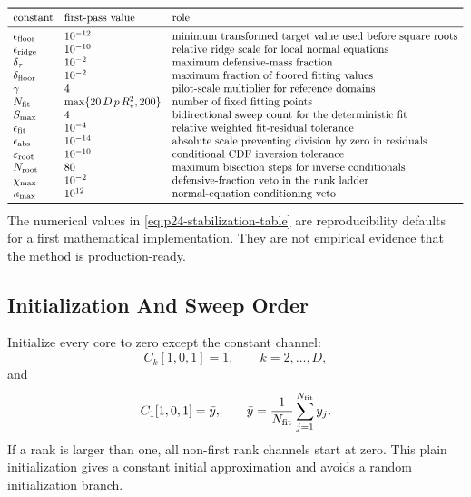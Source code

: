 \documentclass[11pt]{article}
\numberwithin{equation}{section}
\begin{document}
\begin{equation}
\begin{array}{lll}
\toprule
\text{constant} & \text{first-pass value} & \text{role}\\
\midrule
\epsilon_{\rm floor} & 10^{-12} &
    \text{minimum transformed target value used before square roots}\\
\epsilon_{\rm ridge} & 10^{-10} &
    \text{relative ridge scale for local normal equations}\\
\delta_\tau & 10^{-2} &
    \text{maximum defensive-mass fraction}\\
\delta_{\rm floor} & 10^{-2} &
    \text{maximum fraction of floored fitting values}\\
\gamma & 4 &
    \text{pilot-scale multiplier for reference domains}\\
N_{\rm fit} & \max\{20\,D\,p\,R_\star^2,200\} &
    \text{number of fixed fitting points}\\
S_{\max} & 4 &
    \text{bidirectional sweep count for the deterministic fit}\\
\epsilon_{\rm fit} & 10^{-4} &
    \text{relative weighted fit-residual tolerance}\\
\epsilon_{\rm abs} & 10^{-14} &
    \text{absolute scale preventing division by zero in residuals}\\
\varepsilon_{\rm root} & 10^{-10} &
    \text{conditional CDF inversion tolerance}\\
N_{\rm root} & 80 &
    \text{maximum bisection steps for inverse conditionals}\\
\chi_{\max} & 10^{-2} &
    \text{defensive-fraction veto in the rank ladder}\\
\kappa_{\max} & 10^{12} &
    \text{normal-equation conditioning veto}\\
\bottomrule
\end{array}
\label{eq:p24-stabilization-table}
\end{equation}
The numerical values in \eqref{eq:p24-stabilization-table} are reproducibility
defaults for a first mathematical implementation.  They are not empirical
evidence that the method is production-ready.

\subsection{Initialization And Sweep Order}

Initialize every core to zero except the constant channel:
\[
    C_k[1,0,1]=1,\qquad k=2,\ldots,D,
\]
and
\[
    C_1[1,0,1]=\bar y,\qquad
    \bar y=\frac1{N_{\rm fit}}\sum_{j=1}^{N_{\rm fit}}y_j.
\]
If a rank is larger than one, all non-first rank channels start at zero.  This
plain initialization gives a constant initial approximation and avoids a random
initialization branch.
\end{document}
